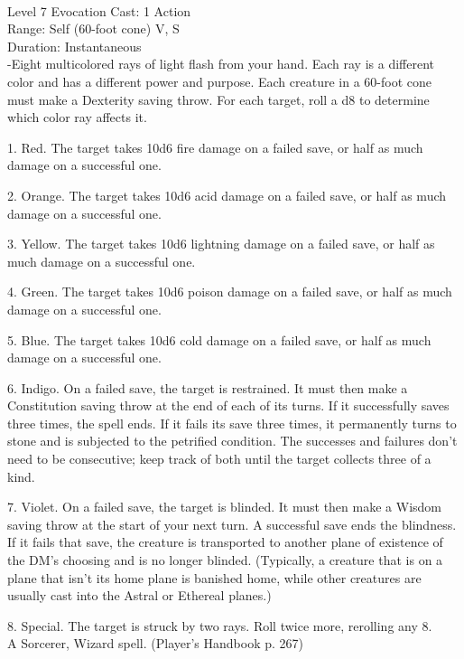 \documentclass[10pt,twocolumn]{report}
\begin{document}
 \\
Level 7 \quad Evocation \quad Cast: 1 Action\\
Range: Self (60-foot cone) \quad V, S\\
Duration: Instantaneous \quad \\
-Eight multicolored rays of light flash from your hand. Each ray is a different color and has a different power and purpose. Each creature in a 60-foot cone must make a Dexterity saving throw. For each target, roll a d8 to determine which color ray affects it.

1. Red. The target takes 10d6 fire damage on a failed save, or half as much damage on a successful one.

2. Orange. The target takes 10d6 acid damage on a failed save, or half as much damage on a successful one.

3. Yellow. The target takes 10d6 lightning damage on a failed save, or half as much damage on a successful one.

4. Green. The target takes 10d6 poison damage on a failed save, or half as much damage on a successful one.

5. Blue. The target takes 10d6 cold damage on a failed save, or half as much damage on a successful one.

6. Indigo. On a failed save, the target is restrained. It must then make a Constitution saving throw at the end of each of its turns. If it successfully saves three times, the spell ends. If it fails its save three times, it permanently turns to stone and is subjected to the petrified condition. The successes and failures don’t need to be consecutive; keep track of both until the target collects three of a kind.

7. Violet. On a failed save, the target is blinded. It must then make a Wisdom saving throw at the start of your next turn. A successful save ends the blindness. If it fails that save, the creature is transported to another plane of existence of the DM’s choosing and is no longer blinded. (Typically, a creature that is on a plane that isn’t its home plane is banished home, while other creatures are usually cast into the Astral or Ethereal planes.)

8. Special. The target is struck by two rays. Roll twice more, rerolling any 8.\\
A Sorcerer, Wizard spell. (Player's Handbook p. 267) \\
\end{document}
